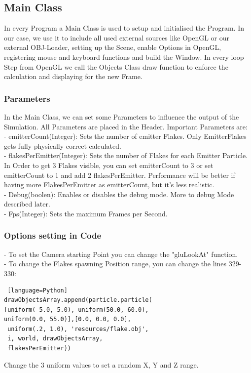 \documentclass{sig-alternate-05-2015}
\begin{document}
\subsection{Main Class}
In every Program a Main Class is used to setup and initialised the Program. In our case, we use it to include all used external sources like OpenGL or our external OBJ-Loader, setting up the Scene, enable Options in OpenGL, registering mouse and keyboard functions and build the Window. In every loop Step from OpenGL we call the Objects Class draw function to enforce the calculation and displaying for the new Frame.\\
\subsubsection{Parameters}
In the Main Class, we can set some Parameters to influence the output of the Simulation. All Parameters are placed in the Header. Important Parameters are:\\
- emitterCount(Integer): Sets the number of emitter Flakes. Only EmitterFlakes gets fully physically correct calculated. \\
- flakesPerEmitter(Integer): Sets the number of Flakes for each Emitter Particle. In Order to get 3 Flakes visible, you can set emitterCount to 3 or set emitterCount to 1 and add 2 flakesPerEmitter. Performance will be better if having more FlakesPerEmitter as emitterCount, but it’s less realistic.\\
- Debug(boolen): Enables or disables the debug mode. More to debug Mode described later. \\
- Fps(Integer): Sets the maximum Frames per Second.\\
\subsubsection{Options setting in Code}
- To set the Camera starting Point you can change the "gluLookAt" function.\\
- To change the Flakes spawning Position range, you can change the lines 329-330:\\
\begin{lstlisting} [language=Python]
drawObjectsArray.append(particle.particle(
[uniform(-5.0, 5.0), uniform(50.0, 60.0), 
uniform(0.0, 55.0)],[0.0, 0.0, 0.0],
 uniform(.2, 1.0), 'resources/flake.obj',
 i, world, drawObjectsArray,
 flakesPerEmitter))
\end{lstlisting}
Change the 3 uniform values to set a random X, Y and Z range. \\
\end{document}
